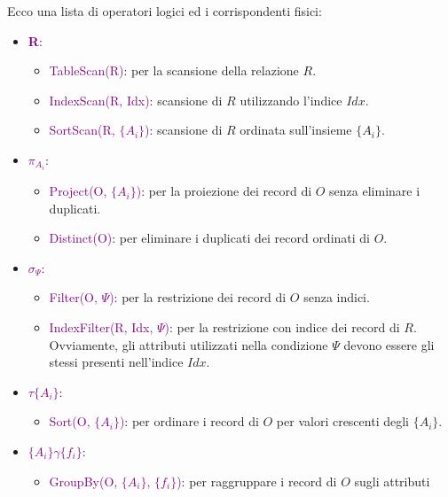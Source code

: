 Ecco una lista di operatori logici ed i corrispondenti fisici:
\begin{itemize}
    \item \textbf{\textcolor{purple}{R}}:
        \begin{itemize}
            \item \textcolor{purple}{TableScan(R)}: per la scansione della relazione $R$.
            \item \textcolor{purple}{IndexScan(R, Idx)}: scansione di $R$ utilizzando l'indice $Idx$.
            \item \textcolor{purple}{SortScan(R, $\{A_i\}$)}: scansione di $R$ ordinata sull'insieme $\{A_i\}$.
        \end{itemize}
    \item \textbf{\textcolor{purple}{$\pi_{A_i}$}}:
        \begin{itemize}
            \item \textcolor{purple}{Project(O, $\{A_i\}$)}: per la proiezione dei record di $O$ senza eliminare i duplicati.
            \item \textcolor{purple}{Distinct(O)}: per eliminare i duplicati dei record ordinati di $O$.
        \end{itemize}
    \item \textbf{\textcolor{purple}{$\sigma_{\Psi}$}}:
        \begin{itemize}
            \item \textcolor{purple}{Filter(O, $\Psi$)}: per la restrizione dei record di $O$ senza indici.
            \item \textcolor{purple}{IndexFilter(R, Idx, $\Psi$)}: per la restrizione con indice dei record di $R$.
                Ovviamente, gli attributi utilizzati nella condizione $\Psi$ devono essere gli stessi presenti nell'indice $Idx$.
        \end{itemize}
    \item \textbf{\textcolor{purple}{$\tau{\{A_i\}}$}}:
        \begin{itemize}
            \item \textcolor{purple}{Sort(O, $\{A_i\}$)}: per ordinare i record di $O$ per valori crescenti degli $\{A_i\}$.
        \end{itemize}
    \item \textbf{\textcolor{purple}{$\{A_i\}\gamma\{f_i\}$}}:
        \begin{itemize}
            \item \textcolor{purple}{GroupBy(O, $\{A_i\}$, $\{f_i\}$)}: per raggruppare i record di $O$ sugli attributi

\end{itemize}
\end{itemize}
